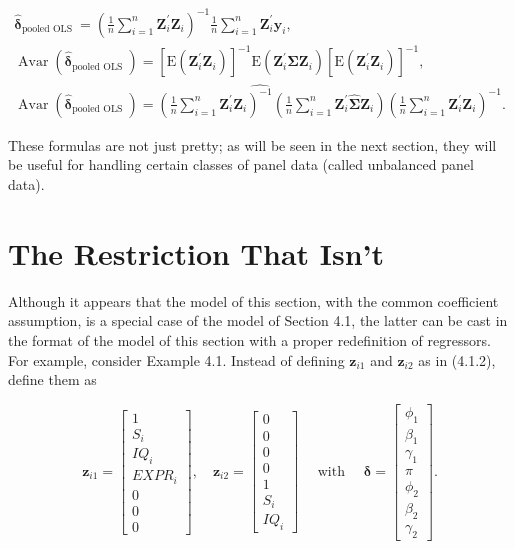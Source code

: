 \documentclass[10pt]{article}
\begin{document}
\begin{gather*}
\hat{\boldsymbol{\delta}}_{\text {pooled OLS }}=\left(\frac{1}{n} \sum_{i=1}^{n} \mathbf{Z}_{i}^{\prime} \mathbf{Z}_{i}\right)^{-1} \frac{1}{n} \sum_{i=1}^{n} \mathbf{Z}_{i}^{\prime} \mathbf{y}_{i},  \tag{$\prime$}\\
\operatorname{Avar}\left(\hat{\boldsymbol{\delta}}_{\text {pooled OLS }}\right)=\left[\mathrm{E}\left(\mathbf{Z}_{i}^{\prime} \mathbf{Z}_{i}\right)\right]^{-1} \mathrm{E}\left(\mathbf{Z}_{i}^{\prime} \boldsymbol{\Sigma} \mathbf{Z}_{i}\right)\left[\mathrm{E}\left(\mathbf{Z}_{i}^{\prime} \mathbf{Z}_{i}\right)\right]^{-1},  \tag{$\prime$}\\
\widehat{\operatorname{Avar}\left(\hat{\boldsymbol{\delta}}_{\text {pooled OLS }}\right)=\left(\frac{1}{n} \sum_{i=1}^{n} \mathbf{Z}_{i}^{\prime} \mathbf{Z}_{i}\right)^{-1}\left(\frac{1}{n} \sum_{i=1}^{n} \mathbf{Z}_{i}^{\prime} \widehat{\mathbf{\Sigma}} \mathbf{Z}_{i}\right)\left(\frac{1}{n} \sum_{i=1}^{n} \mathbf{Z}_{i}^{\prime} \mathbf{Z}_{i}\right)^{-1} .} \tag{4.6.14'}
\end{gather*}


These formulas are not just pretty; as will be seen in the next section, they will be useful for handling certain classes of panel data (called unbalanced panel data).

\section*{The Restriction That Isn't}
Although it appears that the model of this section, with the common coefficient assumption, is a special case of the model of Section 4.1, the latter can be cast in the format of the model of this section with a proper redefinition of regressors. For example, consider Example 4.1. Instead of defining $\mathbf{z}_{i 1}$ and $\mathbf{z}_{i 2}$ as in (4.1.2), define them as

$$
\mathbf{z}_{i 1}=\left[\begin{array}{c}
1 \\
S_{i} \\
I Q_{i} \\
E X P R_{i} \\
0 \\
0 \\
0
\end{array}\right], \quad \mathbf{z}_{i 2}=\left[\begin{array}{c}
0 \\
0 \\
0 \\
0 \\
1 \\
S_{i} \\
I Q_{i}
\end{array}\right] \quad \text { with } \quad \boldsymbol{\delta}=\left[\begin{array}{c}
\phi_{1} \\
\beta_{1} \\
\gamma_{1} \\
\pi \\
\phi_{2} \\
\beta_{2} \\
\gamma_{2}
\end{array}\right] .
$$
\end{document}
